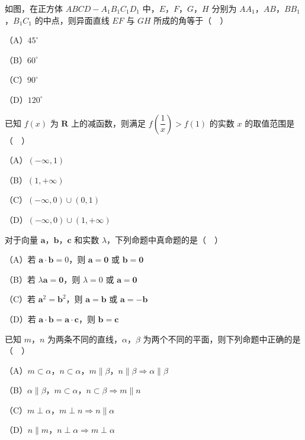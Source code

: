 \endgroup
\begin{question}
如图，在正方体 $ABCD-A_1B_1C_1D_1$ 中，$E$，$F$，$G$，$H$ 分别为 $AA_1$，$AB$，$BB_1$，$B_1C_1$ 的中点，则异面直线 $EF$ 与 $GH$ 所成的角等于（　）
\nopagebreak[4]
\begin{center}\end{center}
\nopagebreak[4]
（A）$45^\circ$

（B）$60^\circ$

（C）$90^\circ$

（D）$120^\circ$

\end{question}
\begin{question}
已知 $f(x)$ 为 $\mathbf R$ 上的减函数，则满足 $f\left(\dfrac1x\right)>f(1)$ 的实数 $x$ 的取值范围是（　）

（A）$(-\infty,1)$

（B）$(1,+\infty)$

（C）$(-\infty,0)\cup(0,1)$

（D）$(-\infty,0)\cup(1,+\infty)$

\end{question}
\begin{question}
对于向量 $\boldsymbol a$，$\boldsymbol b$，$\boldsymbol c$ 和实数 $\lambda$，下列命题中真命题的是（　）

（A）若 $\boldsymbol a\cdot\boldsymbol b=0$，则 $\boldsymbol a=\boldsymbol 0$ 或 $\boldsymbol b=\boldsymbol 0$

（B）若 $\lambda\boldsymbol a=\boldsymbol 0$，则 $\lambda=0$ 或 $\boldsymbol a=\boldsymbol 0$

（C）若 $\boldsymbol a^2=\boldsymbol b^2$，则 $\boldsymbol a=\boldsymbol b$ 或 $\boldsymbol a=-\boldsymbol b$

（D）若 $\boldsymbol a\cdot\boldsymbol b=\boldsymbol a\cdot\boldsymbol c$，则 $\boldsymbol b=\boldsymbol c$

\end{question}
\begin{question}
已知 $m$，$n$ 为两条不同的直线，$\alpha$，$\beta$ 为两个不同的平面，则下列命题中正确的是（　）

（A）$m\subset\alpha$，$n\subset\alpha$，$m\parallel\beta$，$n\parallel\beta\Rightarrow\alpha\parallel\beta$

（B）$\alpha\parallel\beta$，$m\subset\alpha$，$n\subset\beta\Rightarrow m\parallel n$

（C）$m\perp\alpha$，$m\perp n\Rightarrow n\parallel\alpha$

（D）$n\parallel m$，$n\perp\alpha\Rightarrow m\perp\alpha$

\end{question}
